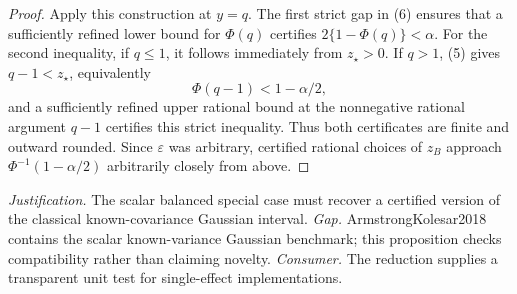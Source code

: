 \documentclass{article}
\begin{document}
\begin{proof}
Apply this construction at \(y=q\).  The first strict gap in (6) ensures
that a sufficiently refined lower bound for \(\Phi(q)\) certifies
\(2\{1-\Phi(q)\}<\alpha\).  For the second inequality, if \(q\leq1\), it
follows immediately from \(z_\star>0\).  If \(q>1\), (5) gives
\(q-1<z_\star\), equivalently
\[
 \Phi(q-1)<1-\alpha/2,
\]
and a sufficiently refined upper rational bound at the nonnegative rational
argument \(q-1\) certifies this strict inequality.  Thus both certificates
are finite and outward rounded.  Since \(\varepsilon\) was arbitrary,
certified rational choices of \(z_B\) approach
\(\Phi^{-1}(1-\alpha/2)\) arbitrarily closely from above.
\end{proof}
\par\smallskip\noindent \textit{Justification.} The scalar balanced special case must recover a certified version of the classical known-covariance Gaussian interval. \textit{Gap.} ArmstrongKolesar2018 contains the scalar known-variance Gaussian benchmark; this proposition checks compatibility rather than claiming novelty. \textit{Consumer.} The reduction supplies a transparent unit test for single-effect implementations.
\end{document}
